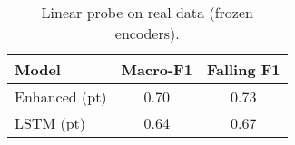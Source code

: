\begin{table}[t]\centering\caption{Linear probe on real data (frozen encoders).}\begin{tabular}{lcc}\toprule
Model & Macro-F1 & Falling F1 \\
\midrule
Enhanced (pt) & 0.70 & 0.73 \\
LSTM (pt) & 0.64 & 0.67 \\
\bottomrule\end{tabular}\end{table}
